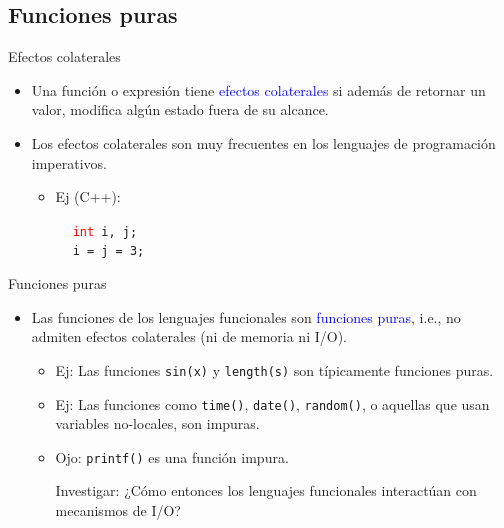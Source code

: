 \documentclass{beamer} %
\newcommand{\blue}[1]{\textcolor{blue}{#1}}
\newcommand{\red}[1]{\textcolor{red}{#1}}
\newcommand{\gray}[1]{{\color{gray!50!white}{#1}}}
\begin{document}
\subsection{Funciones puras}

\begin{frame}{Efectos colaterales}
    \begin{itemize}
        \item<1-> Una función o expresión tiene \blue{efectos colaterales} si además de retornar un valor, modifica algún estado fuera de su alcance.
        \item<2-> Los efectos colaterales son muy frecuentes en los lenguajes de programación imperativos.
        \medskip
        
        \begin{itemize}
            \item Ej (C++):\medskip
            
            $~~~~$ \texttt{\red{int} i, j;}\\
            $~~~~$ \texttt{i = j = 3;} \gray{\texttt{//C++ lee i = (j = 3)}}
        \end{itemize}
    \end{itemize}
\end{frame}

\begin{frame}{Funciones puras}
    \begin{itemize}
        \item<1-> Las funciones de los lenguajes funcionales son \blue{funciones puras}, i.e., no admiten efectos colaterales (ni de memoria ni I/O).
        \begin{itemize}
            \item<2-> Ej: Las funciones \texttt{sin(x)} y \texttt{length(s)} son típicamente funciones puras.
            \item<3-> Ej: Las funciones como \texttt{time()}, \texttt{date()}, \texttt{random()}, o aquellas que usan variables no-locales, son impuras.
            \item<4-> Ojo: \texttt{printf()} es una función impura.
            \medskip
            
            Investigar: ¿Cómo entonces los lenguajes funcionales interactúan con mecanismos de I/O?
        \end{itemize}
    \end{itemize}
\end{frame}
\end{document}
